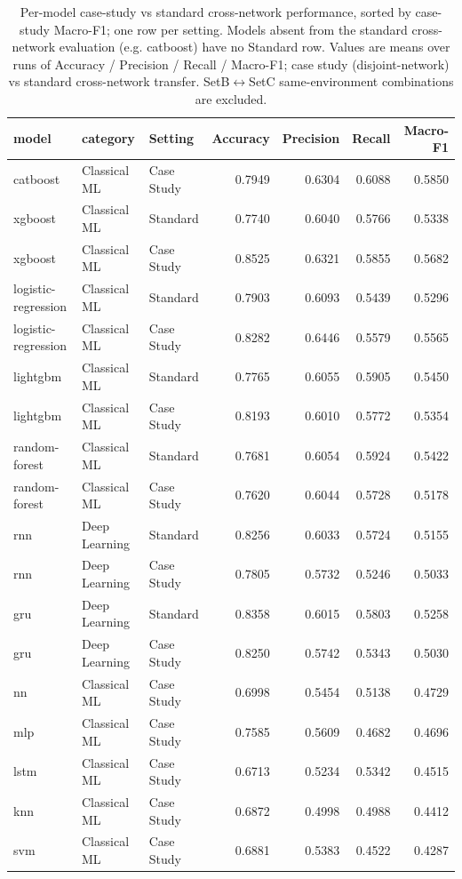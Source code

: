 \begin{table}
\caption{Per-model case-study vs standard cross-network performance, sorted by case-study Macro-F1; one row per setting. Models absent from the standard cross-network evaluation (e.g. catboost) have no Standard row. Values are means over runs of Accuracy / Precision / Recall / Macro-F1; case study (disjoint-network) vs standard cross-network transfer. SetB$\leftrightarrow$SetC same-environment combinations are excluded.}
\label{tab:q5_appendix_per_model}
\begin{tabular}{lllrrrr}
\toprule
model & category & Setting & Accuracy & Precision & Recall & Macro-F1 \\
\midrule
catboost & Classical ML & Case Study & 0.7949 & 0.6304 & 0.6088 & 0.5850 \\
xgboost & Classical ML & Standard & 0.7740 & 0.6040 & 0.5766 & 0.5338 \\
xgboost & Classical ML & Case Study & 0.8525 & 0.6321 & 0.5855 & 0.5682 \\
logistic-regression & Classical ML & Standard & 0.7903 & 0.6093 & 0.5439 & 0.5296 \\
logistic-regression & Classical ML & Case Study & 0.8282 & 0.6446 & 0.5579 & 0.5565 \\
lightgbm & Classical ML & Standard & 0.7765 & 0.6055 & 0.5905 & 0.5450 \\
lightgbm & Classical ML & Case Study & 0.8193 & 0.6010 & 0.5772 & 0.5354 \\
random-forest & Classical ML & Standard & 0.7681 & 0.6054 & 0.5924 & 0.5422 \\
random-forest & Classical ML & Case Study & 0.7620 & 0.6044 & 0.5728 & 0.5178 \\
rnn & Deep Learning & Standard & 0.8256 & 0.6033 & 0.5724 & 0.5155 \\
rnn & Deep Learning & Case Study & 0.7805 & 0.5732 & 0.5246 & 0.5033 \\
gru & Deep Learning & Standard & 0.8358 & 0.6015 & 0.5803 & 0.5258 \\
gru & Deep Learning & Case Study & 0.8250 & 0.5742 & 0.5343 & 0.5030 \\
nn & Classical ML & Case Study & 0.6998 & 0.5454 & 0.5138 & 0.4729 \\
mlp & Classical ML & Case Study & 0.7585 & 0.5609 & 0.4682 & 0.4696 \\
lstm & Classical ML & Case Study & 0.6713 & 0.5234 & 0.5342 & 0.4515 \\
knn & Classical ML & Case Study & 0.6872 & 0.4998 & 0.4988 & 0.4412 \\
svm & Classical ML & Case Study & 0.6881 & 0.5383 & 0.4522 & 0.4287 \\
\bottomrule
\end{tabular}
\end{table}
